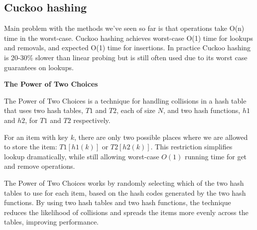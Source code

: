 \documentclass[12pt]{article}
\newcommand{\1}{\space \quad}
\newcommand{\2}{\quad \quad \quad}
\newcommand{\3}{\quad \quad \quad \quad \space}
\newcommand{\4}{\quad \quad \quad \quad \quad \quad}
\begin{document}
\subsection{Cuckoo hashing}
Main problem with the methods we’ve seen so far is that operations
take O(n) time in the worst-case.
Cuckoo hashing achieves worst-case O(1) time for lookups and
removals, and expected O(1) time for insertions.
In practice Cuckoo hashing is 20-30\% slower than linear probing but
is still often used due to its worst case guarantees on lookups.

\vspace{10pt}

\textbf{The Power of Two Choices}

\vspace{10pt}
The Power of Two Choices is a technique for handling collisions in a hash table that uses two hash tables, $T1$ and $T2$, each of size $N$, and two hash functions, $h1$ and $h2$, for $T1$ and $T2$ respectively.

\vspace{10pt}
For an item with key $k$, there are only two possible places where we are allowed to store the item: $T1[h1(k)]$ or $T2[h2(k)]$. This restriction simplifies lookup dramatically, while still allowing worst-case $O(1)$ running time for get and remove operations.

\vspace{10pt}
The Power of Two Choices works by randomly selecting which of the two hash tables to use for each item, based on the hash codes generated by the two hash functions. By using two hash tables and two hash functions, the technique reduces the likelihood of collisions and spreads the items more evenly across the tables, improving performance.
\end{document}
